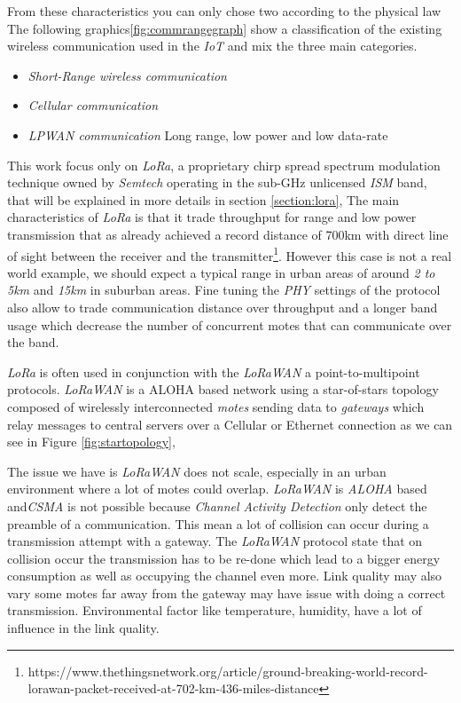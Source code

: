 From these characteristics you can only chose two according to the physical
law %
The following graphics\ref{fig:commrangegraph} show a classification of the
existing wireless communication used in the \emph{IoT} and mix the three main
categories.

\begin{itemize}
    \item \emph{Short-Range wireless communication}
    \item \emph{Cellular communication}
    \item \emph{LPWAN communication} Long range, low power and low data-rate
\end{itemize}



This work focus only on \emph{LoRa}, a proprietary chirp spread spectrum
modulation technique owned by \emph{Semtech} operating in the sub-GHz
unlicensed \emph{ISM} band, that will be explained in more details in section
\ref{section:lora},
The main characteristics of \emph{LoRa} is that it trade throughput for range
and low power transmission that as already achieved a record distance of 700km
with direct line of sight between the receiver and the
transmitter\footnote{https://www.thethingsnetwork.org/article/ground-breaking-world-record-lorawan-packet-received-at-702-km-436-miles-distance}.
However this case is not a real world example, we should expect a typical range
in urban areas of around \emph{2 to 5km} and \emph{15km} in suburban
areas\cite{8030482}. Fine tuning the \emph{PHY} settings of the protocol also
allow to trade communication distance over throughput and a longer band usage
which decrease the number of concurrent motes that can communicate over the
band\cite{10.1145/2988287.2989163}.

\emph{LoRa} is often used in conjunction with the \emph{LoRaWAN} a
point-to-multipoint protocols. \emph{LoRaWAN} is a ALOHA
based\cite{loraalliance:lorawanspecification} network using a star-of-stars
topology composed of wirelessly interconnected \emph{motes} sending data to
\emph{gateways} which relay messages to central servers over a Cellular or
Ethernet connection as we can see in Figure \ref{fig:startopology},



The issue we have is \emph{LoRaWAN} does not
scale\cite{10.1145/2988287.2989163}, especially in an urban environment where a
lot of motes could overlap. \emph{LoRaWAN} is \emph{ALOHA} based and\emph{CSMA}
is not possible because \emph{Channel Activity Detection} only detect the
preamble of a communication. This mean a lot of collision can occur during a
transmission attempt with a gateway. The \emph{LoRaWAN} protocol state that on
collision occur the transmission has to be re-done which lead to a bigger
energy consumption as well as occupying the channel even more.
Link quality may also vary some motes far away from the gateway may have issue
with doing a correct transmission. Environmental factor like temperature,
humidity\cite{evaluation_of_the_reliability_of_lora}, have a lot of influence
in the link quality.

